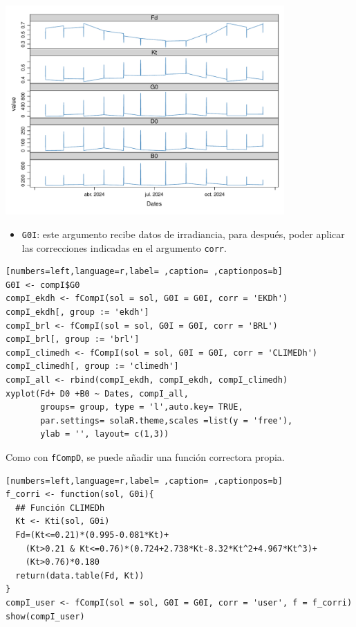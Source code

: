 \begin{itemize}
\begin{center}
\includegraphics[width=0.8\textwidth]{figuras/codigo-fcompicompd.pdf}
\end{center}
\begin{itemize}
\item \texttt{G0I}: este argumento recibe datos de irradiancia, para después, poder aplicar las correcciones indicadas en el argumento \texttt{corr}.
\end{itemize}
\begin{lstlisting}[numbers=left,language=r,label= ,caption= ,captionpos=b]
G0I <- compI$G0
compI_ekdh <- fCompI(sol = sol, G0I = G0I, corr = 'EKDh')
compI_ekdh[, group := 'ekdh']
compI_brl <- fCompI(sol = sol, G0I = G0I, corr = 'BRL')
compI_brl[, group := 'brl']
compI_climedh <- fCompI(sol = sol, G0I = G0I, corr = 'CLIMEDh')
compI_climedh[, group := 'climedh']
compI_all <- rbind(compI_ekdh, compI_ekdh, compI_climedh)
xyplot(Fd+ D0 +B0 ~ Dates, compI_all,
       groups= group, type = 'l',auto.key= TRUE,
       par.settings= solaR.theme,scales =list(y = 'free'),
       ylab = '', layout= c(1,3))
\end{lstlisting}

Como con \texttt{fCompD}, se puede añadir una función correctora propia.
\begin{lstlisting}[numbers=left,language=r,label= ,caption= ,captionpos=b]
f_corri <- function(sol, G0i){
  ## Función CLIMEDh
  Kt <- Kti(sol, G0i)
  Fd=(Kt<=0.21)*(0.995-0.081*Kt)+
    (Kt>0.21 & Kt<=0.76)*(0.724+2.738*Kt-8.32*Kt^2+4.967*Kt^3)+
    (Kt>0.76)*0.180
  return(data.table(Fd, Kt))
}
compI_user <- fCompI(sol = sol, G0I = G0I, corr = 'user', f = f_corri)
show(compI_user)
\end{lstlisting}


\end{itemize}
